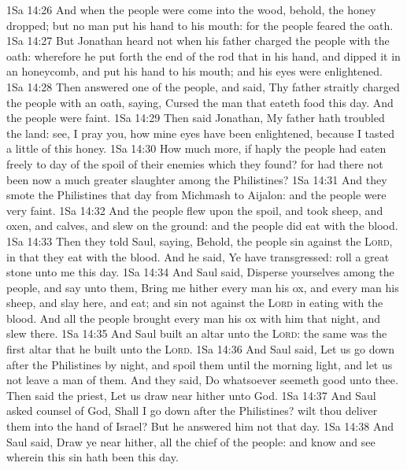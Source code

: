 \vs 1Sa 14:26 And when the people were come into the wood, behold, the honey dropped; but no man put his hand to his mouth: for the people feared the oath.
\vs 1Sa 14:27 But Jonathan heard not when his father charged the people with the oath: wherefore he put forth the end of the rod that  in his hand, and dipped it in an honeycomb, and put his hand to his mouth; and his eyes were enlightened.
\vs 1Sa 14:28 Then answered one of the people, and said, Thy father straitly charged the people with an oath, saying, Cursed  the man that eateth  food this day. And the people were faint.
\vs 1Sa 14:29 Then said Jonathan, My father hath troubled the land: see, I pray you, how mine eyes have been enlightened, because I tasted a little of this honey.
\vs 1Sa 14:30 How much more, if haply the people had eaten freely to day of the spoil of their enemies which they found? for had there not been now a much greater slaughter among the Philistines?
\vs 1Sa 14:31 And they smote the Philistines that day from Michmash to Aijalon: and the people were very faint.
\vs 1Sa 14:32 And the people flew upon the spoil, and took sheep, and oxen, and calves, and slew  on the ground: and the people did eat  with the blood.
\vs 1Sa 14:33 Then they told Saul, saying, Behold, the people sin against the \textsc{Lord}, in that they eat with the blood. And he said, Ye have transgressed: roll a great stone unto me this day.
\vs 1Sa 14:34 And Saul said, Disperse yourselves among the people, and say unto them, Bring me hither every man his ox, and every man his sheep, and slay  here, and eat; and sin not against the \textsc{Lord} in eating with the blood. And all the people brought every man his ox with him that night, and slew  there.
\vs 1Sa 14:35 And Saul built an altar unto the \textsc{Lord}: the same was the first altar that he built unto the \textsc{Lord}.
\vs 1Sa 14:36 And Saul said, Let us go down after the Philistines by night, and spoil them until the morning light, and let us not leave a man of them. And they said, Do whatsoever seemeth good unto thee. Then said the priest, Let us draw near hither unto God.
\vs 1Sa 14:37 And Saul asked counsel of God, Shall I go down after the Philistines? wilt thou deliver them into the hand of Israel? But he answered him not that day.
\vs 1Sa 14:38 And Saul said, Draw ye near hither, all the chief of the people: and know and see wherein this sin hath been this day.
